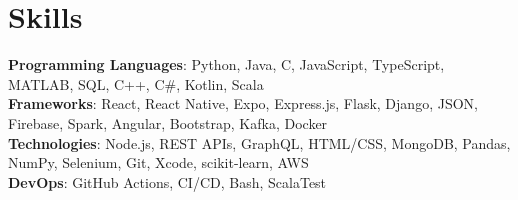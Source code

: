 \section{Skills}
    \begin{itemize}[leftmargin=0.15in, label={}]
	\small{\item{
		\textbf{Programming Languages}{: Python, Java, C, JavaScript, TypeScript, MATLAB, SQL, C++, C\#, Kotlin, Scala} \\
		\textbf{Frameworks}{: React, React Native, Expo, Express.js, Flask, Django, JSON, Firebase, Spark, Angular, Bootstrap, Kafka, Docker} \\
		\textbf{Technologies}{: Node.js, REST APIs, GraphQL,  HTML/CSS, MongoDB, Pandas, NumPy, Selenium, Git, Xcode, scikit-learn, AWS} \\
		\textbf{DevOps}{: GitHub Actions, CI/CD, Bash, ScalaTest} \\
	}}
    \end{itemize}

